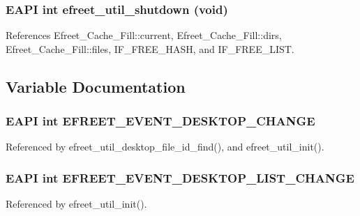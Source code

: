 \subsubsection[efreet\_\-util\_\-shutdown]{\setlength{\rightskip}{0pt plus 5cm}EAPI int efreet\_\-util\_\-shutdown (void)}\label{efreet__utils_8h_3abde568cd48dbea047fbbe2e5d8da10}




References Efreet\_\-Cache\_\-Fill::current, Efreet\_\-Cache\_\-Fill::dirs, Efreet\_\-Cache\_\-Fill::files, IF\_\-FREE\_\-HASH, and IF\_\-FREE\_\-LIST.

\subsection{Variable Documentation}
\subsubsection[EFREET\_\-EVENT\_\-DESKTOP\_\-CHANGE]{\setlength{\rightskip}{0pt plus 5cm}EAPI int {\bf EFREET\_\-EVENT\_\-DESKTOP\_\-CHANGE}}\label{efreet__utils_8h_a55b3b4b6ba75f010ab78a2f581aa043}




Referenced by efreet\_\-util\_\-desktop\_\-file\_\-id\_\-find(), and efreet\_\-util\_\-init().
\subsubsection[EFREET\_\-EVENT\_\-DESKTOP\_\-LIST\_\-CHANGE]{\setlength{\rightskip}{0pt plus 5cm}EAPI int {\bf EFREET\_\-EVENT\_\-DESKTOP\_\-LIST\_\-CHANGE}}\label{efreet__utils_8h_e61719e5f6adda1ac511ccecfb56c1cf}




Referenced by efreet\_\-util\_\-init().